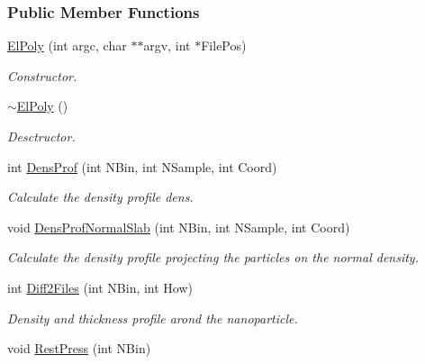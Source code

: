 \subsubsection*{Public Member Functions}
\begin{DoxyCompactItemize}
\item 
\hyperlink{classElPoly_a98503475eca11a72b69cb62879d41183}{El\+Poly} (int argc, char $\ast$$\ast$argv, int $\ast$File\+Pos)\hypertarget{classElPoly_a98503475eca11a72b69cb62879d41183}{}\label{classElPoly_a98503475eca11a72b69cb62879d41183}

\begin{DoxyCompactList}\small\item\em Constructor. \end{DoxyCompactList}\item 
\hyperlink{classElPoly_afdf47e94336886931e93e716f32bb1ee}{$\sim$\+El\+Poly} ()\hypertarget{classElPoly_afdf47e94336886931e93e716f32bb1ee}{}\label{classElPoly_afdf47e94336886931e93e716f32bb1ee}

\begin{DoxyCompactList}\small\item\em Desctructor. \end{DoxyCompactList}\item 
int \hyperlink{classElPoly_a70302b7bbfa248d2963323bc63a4a292}{Dens\+Prof} (int N\+Bin, int N\+Sample, int Coord)
\begin{DoxyCompactList}\small\item\em Calculate the density profile  dens. \end{DoxyCompactList}\item 
void \hyperlink{classElPoly_aff1645802bd67fc1b5bfb3bb1884933a}{Dens\+Prof\+Normal\+Slab} (int N\+Bin, int N\+Sample, int Coord)
\begin{DoxyCompactList}\small\item\em Calculate the density profile projecting the particles on the normal density. \end{DoxyCompactList}\item 
int \hyperlink{classElPoly_a1c3688dd2704504d159802de5815643d}{Diff2\+Files} (int N\+Bin, int How)\hypertarget{classElPoly_a1c3688dd2704504d159802de5815643d}{}\label{classElPoly_a1c3688dd2704504d159802de5815643d}

\begin{DoxyCompactList}\small\item\em Density and thickness profile arond the nanoparticle. \end{DoxyCompactList}\item 
void \hyperlink{classElPoly_a019d255b1ff857ccd34550c7409a595b}{Rest\+Press} (int N\+Bin)\hypertarget{classElPoly_a019d255b1ff857ccd34550c7409a595b}{}\label{classElPoly_a019d255b1ff857ccd34550c7409a595b}


\end{DoxyCompactItemize}
